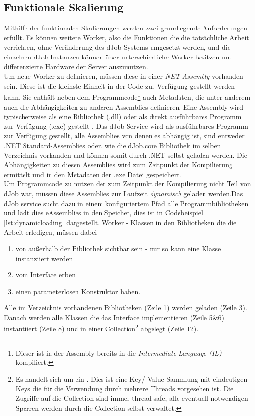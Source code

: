 \subsection{Funktionale Skalierung} \label{sec:dynload}
Mithilfe der funktionalen Skalierungen werden zwei grundlegende Anforderungen erfüllt. Es können weitere Worker, also die Funktionen die die tatsächliche Arbeit verrichten, ohne Veränderung des dJob Systems umgesetzt werden, und die einzelnen dJob Instanzen können über unterschiedliche Worker besitzen um differenzierte Hardware der Server auszunutzen.
\\Um neue Worker zu definieren, müssen diese in einer \emph{\.NET Assembly} vorhanden sein. 
Diese ist die kleinste Einheit in der Code zur Verfügung gestellt werden kann. Sie enthält neben dem Programmcode\footnote{Dieser ist in der Assembly bereits in die \emph{Intermediate Language (IL)} kompiliert.} auch Metadaten, die unter anderem auch die Abhängigkeiten zu anderen Assemblies definieren. Eine Assembly wird typischerweise als eine Bibliothek (.dll) oder als direkt ausführbares Programm zur Verfügung (.exe) gestellt \parencite[S. 17ff]{box}. Das dJob Service wird als ausführbares Programm zur Verfügung gestellt, alle Assemblies von denen es abhängig ist, sind entweder .NET Standard-Assemblies oder, wie die dJob.core Bibliothek im selben Verzeichnis vorhanden und können somit durch .NET selbst geladen werden. Die Abhängigkeiten zu diesen Assemblies wird zum Zeitpunkt der Kompilierung ermittelt und in den Metadaten der .exe Datei gespeichert.
\\Um Programmcode zu nutzen der zum Zeitpunkt der Kompilierung nicht Teil von dJob war, müssen diese Assemblies zur Laufzeit \emph{dynamisch} geladen werden.Das dJob service sucht dazu in einem konfiguriertem Pfad alle Programmbibliotheken und lädt dies eAssemblies in den Speicher, dies ist in Codebeispiel \ref{lst:dynamicloading} dargestellt. 
Worker - Klassen in den Bibliotheken die die Arbeit erledigen, müssen dabei \begin{enumerate}
	\item von außerhalb der Bibliothek sichtbar sein - nur so kann eine Klasse instanziiert werden
	\item vom Interface  erben
	\item einen parameterlosen Konstruktor haben.
\end{enumerate}
Alle im Verzeichnis vorhandenen Bibliotheken (Zeile 1) werden geladen (Zeile 3). Danach werden alle Klassen die das Interface  implementieren (Zeile 5\&6) instantiiert (Zeile 8) und in einer Collection\footnote{Es handelt sich um ein . Dies ist eine Key/ Value Sammlung mit eindeutigen Keys die für die Verwendung durch mehrere Threads vorgesehen ist. Die Zugriffe auf die Collection sind immer thread-safe, alle eventuell notwendigen Sperren werden durch die Collection selbst verwaltet.} abgelegt (Zeile 12).
